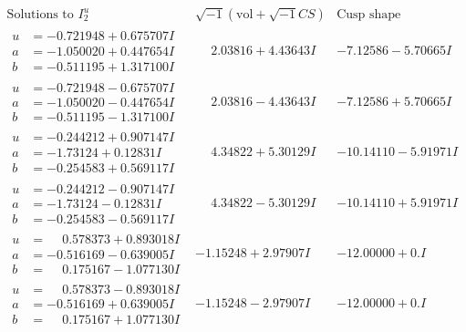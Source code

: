 \documentclass[1p]{elsarticle_modified}
\theoremstyle{definition}
\newcommand{\I}{\sqrt{-1}}
\begin{document}
$$\begin{array}{c|c|c}  
\text{Solutions to }I^u_{2}& \I (\text{vol} + \sqrt{-1}CS) & \text{Cusp shape}\\
 \hline 
\begin{aligned}
u &= -0.721948 + 0.675707 I \\
a &= -1.050020 + 0.447654 I \\
b &= -0.511195 + 1.317100 I\end{aligned}
 & \phantom{-}2.03816 + 4.43643 I & -7.12586 - 5.70665 I \\ \hline\begin{aligned}
u &= -0.721948 - 0.675707 I \\
a &= -1.050020 - 0.447654 I \\
b &= -0.511195 - 1.317100 I\end{aligned}
 & \phantom{-}2.03816 - 4.43643 I & -7.12586 + 5.70665 I \\ \hline\begin{aligned}
u &= -0.244212 + 0.907147 I \\
a &= -1.73124 + 0.12831 I \\
b &= -0.254583 + 0.569117 I\end{aligned}
 & \phantom{-}4.34822 + 5.30129 I & -10.14110 - 5.91971 I \\ \hline\begin{aligned}
u &= -0.244212 - 0.907147 I \\
a &= -1.73124 - 0.12831 I \\
b &= -0.254583 - 0.569117 I\end{aligned}
 & \phantom{-}4.34822 - 5.30129 I & -10.14110 + 5.91971 I \\ \hline\begin{aligned}
u &= \phantom{-}0.578373 + 0.893018 I \\
a &= -0.516169 - 0.639005 I \\
b &= \phantom{-}0.175167 - 1.077130 I\end{aligned}
 & -1.15248 + 2.97907 I & -12.00000 + 0. I\phantom{ +0.000000I} \\ \hline\begin{aligned}
u &= \phantom{-}0.578373 - 0.893018 I \\
a &= -0.516169 + 0.639005 I \\
b &= \phantom{-}0.175167 + 1.077130 I\end{aligned}
 & -1.15248 - 2.97907 I & -12.00000 + 0. I\phantom{ +0.000000I} \\ \hline\begin{aligned}

\end{aligned}
\end{array}$$
\end{document}
